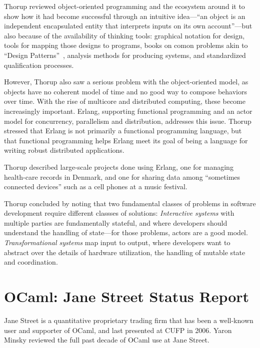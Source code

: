 \documentclass{jfp1}
\begin{document}
Thorup reviewed object-oriented programming and the ecosystem around
it to show how it had become successful through an intuitive
idea---``an object is an independent encapsulated entity that
interprets
inputs on its own account''---but also because of the availability of
thinking tools: graphical notation for design, tools for mapping those
designs to programs, books on comon problems akin to ``Design
Patterns''~\cite{GammaHelmJohnsonVlissides1995}, analysis methods for producing systems,
and standardized qualification processes.

However, Thorup also saw a serious problem with the object-oriented model,
as objects have no coherent model of time and no good way to compose
behaviors over time.  With the rise of multicore and distributed
computing, these become increasingly important.  Erlang, supporting
functional programming and an actor model for concurrency, parallelism
and distribution, addresses this issue.  Thorup stressed that Erlang
is not primarily a functional programming language, but that
functional programming helps Erlang meet its goal of being a
language for writing robust distributed applications.

Thorup described large-scale projects done using Erlang, one for
managing health-care records in Denmark, and one for sharing data
among ``sometimes connected devices'' such as a cell phones at a music
festival.

Thorup concluded by noting that two fundamental classes of problems in
software development require different classses of solutions:
\textit{Interactive systems} with multiple parties are fundamentally
stateful, and where developers should understand the handling of
state---for those problems, actors are a good model.
\textit{Transformational systems} map input to output, where
developers want to abstract over the details of hardware utilization,
the handling of mutable state and coordination.

\section{OCaml: Jane Street Status Report}

Jane Street is a quantitative proprietary trading firm that has been a
well-known user and supporter of OCaml, and last presented at CUFP in
2006.  Yaron Minsky reviewed the full past decade of OCaml use at Jane Street.
\end{document}
